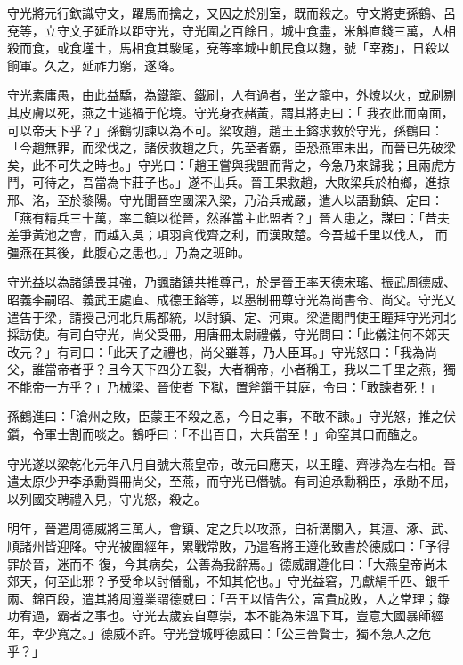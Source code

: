 \begin{pinyinscope}
 守光將元行欽識守文，躍馬而擒之，又囚之於別室，既而殺之。守文將吏孫鶴、呂兗等，立守文子延祚以距守光，守光圍之百餘日，城中食盡，米斛直錢三萬，人相殺而食，或食墐土，馬相食其駿尾，兗等率城中飢民食以麴，號「宰務」，日殺以餉軍。久之，延祚力窮，遂降。



 守光素庸愚，由此益驕，為鐵籠、鐵刷，人有過者，坐之籠中，外燎以火，或刷剔其皮膚以死，燕之士逃禍于佗境。守光身衣赭黃，謂其將吏曰：「
 我衣此而南面，可以帝天下乎？」孫鶴切諫以為不可。梁攻趙，趙王王鎔求救於守光，孫鶴曰：「今趙無罪，而梁伐之，諸侯救趙之兵，先至者霸，臣恐燕軍未出，而晉已先破梁矣，此不可失之時也。」守光曰：「趙王嘗與我盟而背之，今急乃來歸我；且兩虎方鬥，可待之，吾當為卞莊子也。」遂不出兵。晉王果救趙，大敗梁兵於柏鄉，進掠邢、洺，至於黎陽。守光聞晉空國深入梁，乃治兵戒嚴，遣人以語動鎮、定曰：「燕有精兵三十萬，率二鎮以從晉，然誰當主此盟者？」晉人患之，謀曰：「昔夫差爭黃池之會，而越入吳；項羽貪伐齊之利，而漢敗楚。今吾越千里以伐人，
 而彊燕在其後，此腹心之患也。」乃為之班師。



 守光益以為諸鎮畏其強，乃諷諸鎮共推尊己，於是晉王率天德宋瑤、振武周德威、昭義李嗣昭、義武王處直、成德王鎔等，以墨制冊尊守光為尚書令、尚父。守光又遣告于梁，請授己河北兵馬都統，以討鎮、定、河東。梁遣閣門使王瞳拜守光河北採訪使。有司白守光，尚父受冊，用唐冊太尉禮儀，守光問曰：「此儀注何不郊天改元？」有司曰：「此天子之禮也，尚父雖尊，乃人臣耳。」守光怒曰：「我為尚父，誰當帝者乎？且今天下四分五裂，大者稱帝，小者稱王，我以二千里之燕，獨不能帝一方乎？」乃械梁、晉使者
 下獄，置斧鑕于其庭，令曰：「敢諫者死！」



 孫鶴進曰：「滄州之敗，臣蒙王不殺之恩，今日之事，不敢不諫。」守光怒，推之伏鑕，令軍士割而啖之。鶴呼曰：「不出百日，大兵當至！」命窒其口而醢之。



 守光遂以梁乾化元年八月自號大燕皇帝，改元曰應天，以王瞳、齊涉為左右相。晉遣太原少尹李承勳賀冊尚父，至燕，而守光已僭號。有司迫承勳稱臣，承勛不屈，以列國交聘禮入見，守光怒，殺之。



 明年，晉遣周德威將三萬人，會鎮、定之兵以攻燕，自祈溝關入，其澶、涿、武、順諸州皆迎降。守光被圍經年，累戰常敗，乃遣客將王遵化致書於德威曰：「予得罪於晉，迷而不
 復，今其病矣，公善為我辭焉。」德威謂遵化曰：「大燕皇帝尚未郊天，何至此邪？予受命以討僭亂，不知其佗也。」守光益窘，乃獻絹千匹、銀千兩、錦百段，遣其將周遵業謂德威曰：「吾王以情告公，富貴成敗，人之常理；錄功宥過，霸者之事也。守光去歲妄自尊崇，本不能為朱溫下耳，豈意大國暴師經年，幸少寬之。」德威不許。守光登城呼德威曰：「公三晉賢士，獨不急人之危乎？」




\end{pinyinscope}
